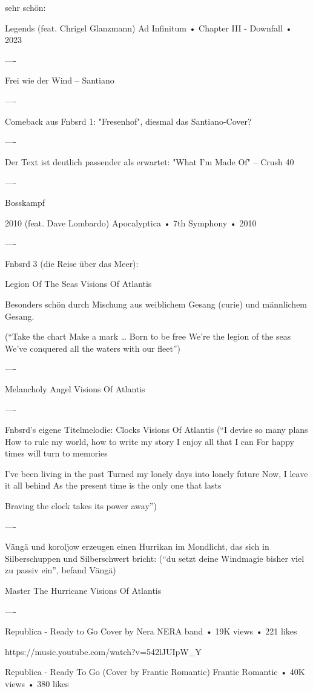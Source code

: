 sehr schön:


Legends (feat. Chrigel Glanzmann)
Ad Infinitum
 •
Chapter III - Downfall
 • 2023

----

Frei wie der Wind – Santiano

----

Comeback aus Fnbsrd 1: "Fresenhof", diesmal das Santiano-Cover?

----

Der Text ist deutlich passender als erwartet:
"What I'm Made Of" – Crush 40

----

Bosskampf

2010 (feat. Dave Lombardo)
Apocalyptica
 •
7th Symphony
 •
2010

----

Fnbsrd 3 (die Reise über das Meer):

Legion Of The Seas
Visions Of Atlantis

Besonders schön durch Mischung aus weiblichem Gesang (curie) und männlichem Gesang.

(“Take the chart
Make a mark
…
Born to be free
We're the legion of the seas
We've conquered all the waters with our fleet”)

----

Melancholy Angel
Visions Of Atlantis

----

Fnbsrd’s eigene Titelmelodie:
Clocks
Visions Of Atlantis
(“I devise so many plans
How to rule my world, how to write my story
I enjoy all that I can
For happy times will turn to memories

I've been living in the past
Turned my lonely days into lonely future
Now, I leave it all behind
As the present time is the only one that lasts

Braving the clock takes its power away”)

----

Vängä und koroljow erzeugen einen Hurrikan im Mondlicht, das sich in Silberschuppen und Silberschwert bricht:
(“du setzt deine Windmagie bisher viel zu passiv ein”, befand Vängä)

Master The Hurricane
Visions Of Atlantis

----

Republica - Ready to Go Cover by Nera
NERA band
 • 19K views • 221 likes

https://music.youtube.com/watch?v=542lJUIpW_Y


Republica - Ready To Go (Cover by Frantic Romantic)
Frantic Romantic
 • 40K views • 380 likes



